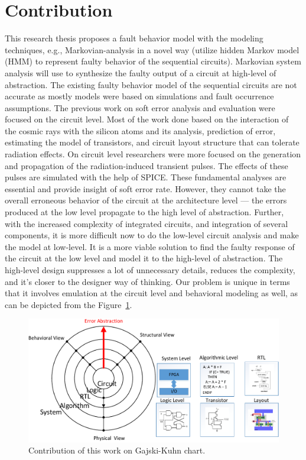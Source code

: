   
\section{Contribution}

This research thesis proposes a fault behavior model with the modeling techniques, e.g., Markovian-analysis in a novel way (utilize hidden Markov model (HMM) to represent faulty behavior of the sequential circuits). Markovian system analysis will use to synthesize the faulty output of a circuit at high-level of abstraction. The existing faulty behavior model of the sequential circuits are not accurate as mostly models were based on simulations and fault occurrence assumptions. 
The previous work on soft error analysis and evaluation were focused on the circuit level. Most of the work done based on the interaction of the cosmic rays with the silicon atoms and its analysis, prediction of error, estimating the model of transistors, and circuit layout structure that can tolerate radiation effects. On circuit level researchers were more focused on the generation and propagation of the radiation-induced transient pulses. The effects of these pulses are simulated with the help of SPICE. These fundamental analyses are essential and provide insight of soft error rate. However, they cannot take the overall erroneous behavior of the circuit at the architecture level --- the errors produced at the low level propagate to the high level of abstraction. Further, with the increased complexity of integrated circuits, and integration of several components, it is more difficult now to do the low-level circuit analysis and make the model at low-level. It is a more viable solution to find the faulty response of the circuit at the low level and model it to the high-level of abstraction. The high-level design suppresses a lot of unnecessary details, reduces the complexity, and it's closer to the designer way of thinking. Our problem is unique in terms that it involves emulation at the circuit level and behavioral modeling as well, as can be depicted from the Figure~\ref{fig:ychart}.

\begin{figure}[tb!]
 \centering
  \captionsetup{justification=centering}    
   \includegraphics[scale=0.8]{Figures/ychart-block.pdf}
   \caption{Contribution of this work on Gajski-Kuhn chart.}
\label{fig:ychart}
\end{figure}

